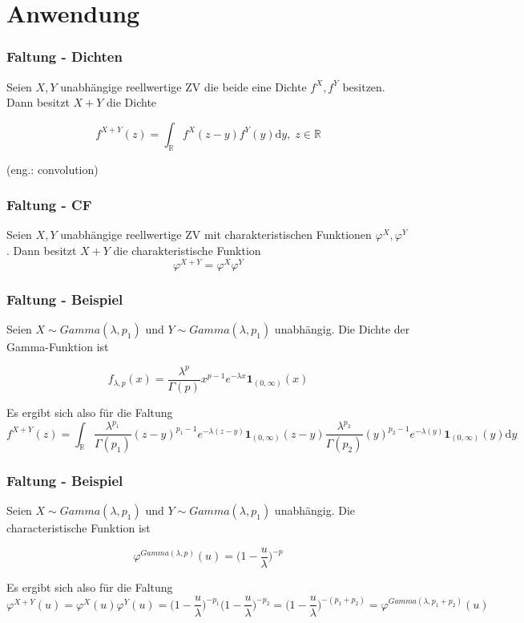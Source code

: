 \documentclass{beamer}
\newcommand{\R}{\mathbb{R}}
\newcommand\dint{\mathord{\mathrm{d}}}
\begin{document}
\section{Anwendung}

\begin{frame}
\frametitle{Faltung - Dichten}
  Seien $X, Y$ unabhängige reellwertige ZV die beide eine Dichte $f^X, f^Y$ besitzen. Dann besitzt $X+Y$ die Dichte

\begin{equation*}
  f^{X+Y}(z) = \int_{\R} f^X(z - y)f^Y(y) \dint y, \; z \in \R
\end{equation*}

(eng.: convolution)
\end{frame}

\begin{frame}
\frametitle{Faltung - CF}
  Seien $X, Y$ unabhängige reellwertige ZV mit charakteristischen Funktionen $\varphi^X, \varphi^Y$. Dann besitzt $X + Y$ die charakteristische Funktion
$$\varphi^{X+Y} = \varphi^X \varphi^Y$$
\end{frame}

\begin{frame}
\frametitle{Faltung - Beispiel}
Seien $X \sim Gamma(\lambda, p_1)$ und $Y \sim Gamma(\lambda, p_1)$ unabhängig. Die Dichte der Gamma-Funktion ist

$$f_{\lambda, p}(x) = \frac{\lambda^p}{\Gamma(p)} x^{p-1} e^{-\lambda x} \mathbf{1}_{(0, \infty)} (x)$$

Es ergibt sich also für die Faltung
{\scriptsize
$$f^{X+Y}(z) = \int_\R \frac{\lambda^{p_1}}{\Gamma(p_1)} (z-y)^{p_1-1} e^{-\lambda (z-y)} \mathbf{1}_{(0, \infty)} (z-y) \frac{\lambda^{p_2}}{\Gamma(p_2)} (y)^{p_2-1} e^{-\lambda (y)} \mathbf{1}_{(0, \infty)} (y) \dint y$$
}%
\end{frame}

\begin{frame}
\frametitle{Faltung - Beispiel}
Seien $X \sim Gamma(\lambda, p_1)$ und $Y \sim Gamma(\lambda, p_1)$ unabhängig. Die characteristische Funktion ist

$$\varphi^{Gamma(\lambda, p)}(u) = \Bigg(1-\frac{u}{\lambda}\Bigg)^{-p}$$

Es ergibt sich also für die Faltung
{\tiny
$$\varphi^{X+Y}(u) = \varphi^{X}(u)\varphi^{Y}(u) = \Bigg(1-\frac{u}{\lambda}\Bigg)^{-p_1} \Bigg(1-\frac{u}{\lambda}\Bigg)^{-p_2} = \Bigg(1-\frac{u}{\lambda}\Bigg)^{-(p_1+p_2)} = \varphi^{Gamma(\lambda, p_1 + p_2)}(u)$$
}%
\end{frame}
\end{document}
